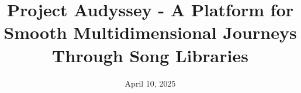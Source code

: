 \documentclass{src/ecsgdp}
\begin{document}
\frontmatter
\title{
    Project Audyssey - A Platform for Smooth Multidimensional Journeys Through Song Libraries
}
\date       {April 10, 2025}
\keywords   {}
\maketitle

\begin{abstract}

\end{abstract}



\tableofcontents
\listoffigures
\listoftables
\lstlistoflistings



\mainmatter













\backmatter




\appendix

\end{document}
